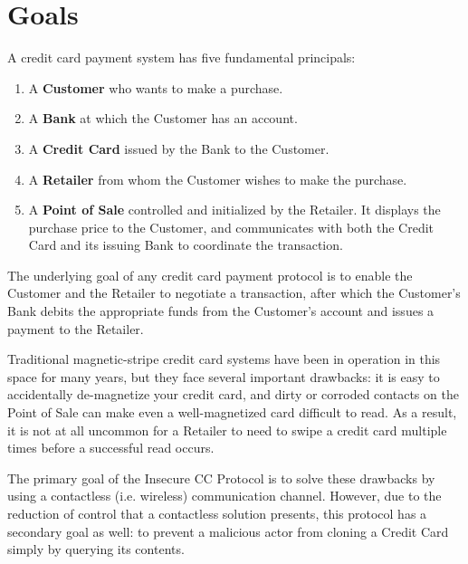 \section{Goals}
\label{sec:insecure-goals}

A credit card payment system has five fundamental principals:

\begin{enumerate}
\item A \textbf{Customer} who wants to make a purchase.
\item A \textbf{Bank} at which the Customer has an account.
\item A \textbf{Credit Card} issued by the Bank to the Customer.
\item A \textbf{Retailer} from whom the Customer wishes to make the purchase.
\item A \textbf{Point of Sale} controlled and initialized by the Retailer.
	It displays the purchase price to the Customer, and communicates with both the Credit Card and its issuing Bank to coordinate the transaction.
\end{enumerate}

The underlying goal of any credit card payment protocol is to enable the Customer and the Retailer to negotiate a transaction,
    after which the Customer's Bank debits the appropriate funds from the Customer's account and issues a payment to the Retailer.

Traditional magnetic-stripe credit card systems have been in operation in this space for many years, but they face several important drawbacks:
    it is easy to accidentally de-magnetize your credit card, and
    dirty or corroded contacts on the Point of Sale can make even a well-magnetized card difficult to read.
As a result, it is not at all uncommon for a Retailer to need to swipe a credit card multiple times before a successful read occurs.

The primary goal of the Insecure CC Protocol is to solve these drawbacks by using a contactless (i.e. wireless) communication channel.
However, due to the reduction of control that a contactless solution presents, this protocol has a secondary goal as well:
    to prevent a malicious actor from cloning a Credit Card simply by querying its contents.
